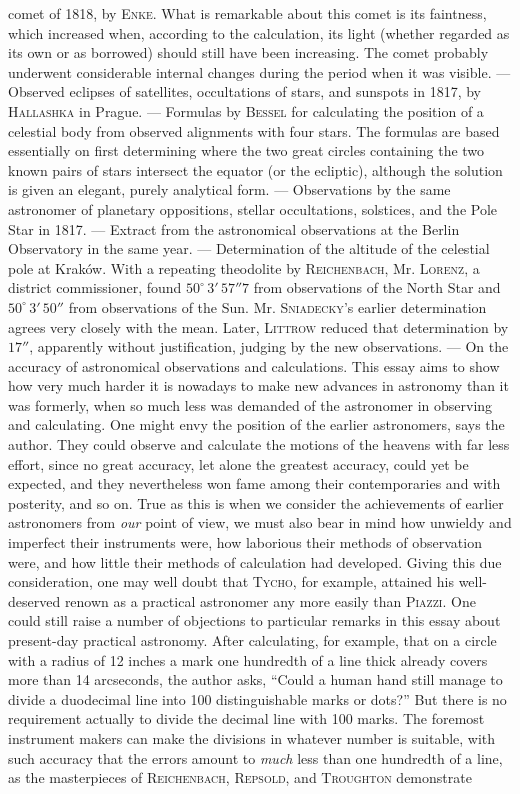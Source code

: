 comet of 1818, by \textsc{Enke}. What is remarkable about this comet is its faintness, which increased when, according to the calculation, its light (whether regarded as its own or as borrowed) should still have been increasing. The comet probably underwent considerable internal changes during the period when it was visible. --- Observed eclipses of satellites, occultations of stars, and sunspots in 1817, by \textsc{Hallashka} in Prague. --- Formulas by \textsc{Bessel} for calculating the position of a celestial body from observed alignments with four stars. The formulas are based essentially on first determining where the two great circles containing the two known pairs of stars intersect the equator (or the ecliptic), although the solution is given an elegant, purely analytical form. --- Observations by the same astronomer of planetary oppositions, stellar occultations, solstices, and the Pole Star in 1817. --- Extract from the astronomical observations at the Berlin Observatory in the same year. --- Determination of the altitude of the celestial pole at Kraków. With a repeating theodolite by \textsc{Reichenbach}, Mr. \textsc{Lorenz}, a district commissioner, found $50^\circ\,3'\,57''7$ from observations of the North Star and $50^\circ\,3'\,50''$ from observations of the Sun. Mr. \textsc{Sniadecky}'s earlier determination agrees very closely with the mean. Later, \textsc{Littrow} reduced that determination by $17''$, apparently without justification, judging by the new observations. --- On the accuracy of astronomical observations and calculations. This essay aims to show how very much harder it is nowadays to make new advances in astronomy than it was formerly, when so much less was demanded of the astronomer in observing and calculating. One might envy the position of the earlier astronomers, says the author. They could observe and calculate the motions of the heavens with far less effort, since no great accuracy, let alone the greatest accuracy, could yet be expected, and they nevertheless won fame among their contemporaries and with posterity, and so on. True as this is when we consider the achievements of earlier astronomers from \emph{our} point of view, we must also bear in mind how unwieldy and imperfect their instruments were, how laborious their methods of observation were, and how little their methods of calculation had developed. Giving this due consideration, one may well doubt that \textsc{Tycho}, for example, attained his well-deserved renown as a practical astronomer any more easily than \textsc{Piazzi}. One could still raise a number of objections to particular remarks in this essay about present-day practical astronomy. After calculating, for example, that on a circle with a radius of 12 inches a mark one hundredth of a line thick already covers more than 14 arcseconds, the author asks, “Could a human hand still manage to divide a duodecimal line into 100 distinguishable marks or dots?” But there is no requirement actually to divide the decimal line with 100 marks. The foremost instrument makers can make the divisions in whatever number is suitable, with such accuracy that the errors amount to \emph{much} less than one hundredth of a line, as the masterpieces of \textsc{Reichenbach}, \textsc{Repsold}, and \textsc{Troughton} demonstrate 